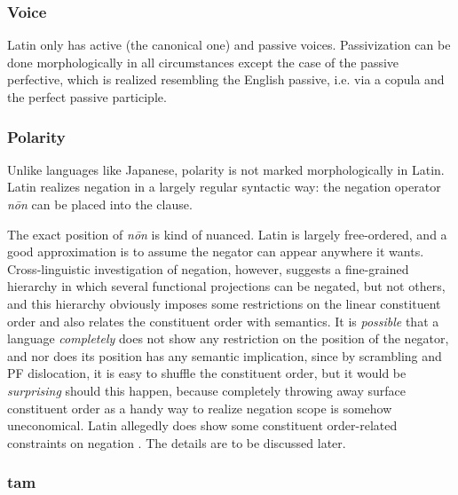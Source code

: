 \documentclass{article}
\newcommand*{\corpus}[1]{\emph{#1}}
\begin{document}
\subsubsection{Voice}\label{sec:voice-abs}

Latin only has active (the canonical one) and passive voices.
Passivization can be done morphologically in all circumstances 
except the case of the passive perfective,
which is realized resembling the English passive,
i.e. via a copula and the perfect passive participle.


\subsubsection{Polarity}\label{sec:polarity-abs}

Unlike languages like Japanese, polarity is not marked morphologically in Latin.
Latin realizes negation in a largely regular syntactic way: 
the negation operator \corpus{n\={o}n} can be placed into the clause.

The exact position of \corpus{n\={o}n} is kind of nuanced.
Latin is largely free-ordered, 
and a good approximation is to assume the negator can appear anywhere it wants.
Cross-linguistic investigation of negation,
however, suggests a fine-grained hierarchy in which several functional projections can be negated,
but not others, 
and this hierarchy obviously imposes some restrictions on the linear constituent order 
and also relates the constituent order with semantics.
It is \emph{possible} that a language \emph{completely} does not show 
any restriction on the position of the negator,
and nor does its position has any semantic implication,
since by scrambling and PF dislocation,
it is easy to shuffle the constituent order,
but it would be \emph{surprising} should this happen,
because completely throwing away surface constituent order as a handy way to realize negation scope
is somehow uneconomical.
Latin allegedly does show some constituent order-related constraints on negation \citep{tierney2018syntactic}.
The details are to be discussed later.

\subsubsection{\ac{tam}}\label{sec:tam-abs}
\end{document}
